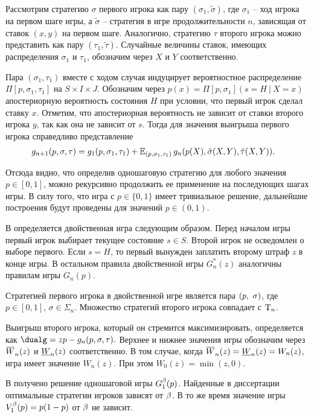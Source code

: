 Рассмотрим стратегию $\sigma$ первого игрока как пару $(\sigma_1, \tilde{\sigma})$, где $\sigma_1$ -- ход игрока на первом шаге игры, а $\tilde{\sigma}$ -- стратегия в игре продолжительности $n$, зависящая от ставок $(x, y)$ на первом шаге.
Аналогично, стратегию $\tau$ второго игрока можно представить как пару $(\tau_1, \tilde{\tau})$.
Случайные величины ставок, имеющих распределения $\sigma_1$ и $\tau_1$, обозначим через $X$ и $Y$ соответственно.

Пара $(\sigma_1, \tau_1)$ вместе с ходом случая индуцирует вероятностное распределение $\Pi[p, \sigma_1, \tau_1]$ на $S \times I \times J$.
Обозначим через
$
  p(x) = \Pi[p, \sigma_1](s = H\ |\ X = x)
$
апостериорную вероятность состояния $H$ при условии, что первый игрок сделал ставку $x$.
Отметим, что апостериорная вероятность не зависит от ставки второго игрока $y$, так как она не зависит от $s$.
Тогда для значения выигрыша первого игрока справедливо представление
\begin{align*}
  g_{n+1}(p, \sigma, \tau) 
  &= 
    g_1(p, \sigma_1, \tau_1) +
    \operatorname{\mathbb{E}}_{( p, \sigma_1, \tau_1 )}
    g_n(p(X), \tilde{\sigma}(X, Y), \tilde{\tau}(X, Y)).
\end{align*}

Отсюда видно, что определив одношаговую стратегию для любого значения $p \in [0, 1]$, можно рекурсивно продолжить ее применение на последующих шагах игры.
В силу того, что игра с $p \in \{0, 1\}$ имеет тривиальное решение, дальнейшие построения будут проведены для значений $p \in (0, 1)$.

В  определяется двойственная игра следующим образом.
Перед началом игры первый игрок выбирает текущее состояние $s \in S$.
Второй игрок не осведомлен о выборе первого.
Если $s = H$, то первый вынужден заплатить второму штраф $z$ в конце игры.
В остальном правила двойственной игры $G^*_n(z)$ аналогичны правилам игры $G_n(p)$.

Стратегией первого игрока в двойственной игре является пара $(p,\ \sigma)$, где $p \in [0, 1]$, $\sigma \in \Sigma_n$.
Множество стратегий второго игрока совпадает с $\mathrm{T}_n$.

Выигрыш второго игрока, который он стремится максимизировать, определяется как
$
  \dualg = z p - g_n(p, \sigma, \tau).
$
Верхнее и нижнее значения игры обозначим через $\HW{n}(z)$ и $\LW{n}(z)$ соответственно.
В том случае, когда $\HW{n}(z) = \LW{n}(z) = W_n(z)$, игра имеет значение $W_n(z)$.
При этом $W_0(z) = \min(z, 0)$.

В  получено решение одношаговой игры $G^{\beta}_1(p)$.
Найденные в диссертации оптимальные стратегии игроков зависят от $\beta$.
В то же время значение игры $V^{\beta}_1(p) = p(1-p)$ от $\beta$ не зависит.

